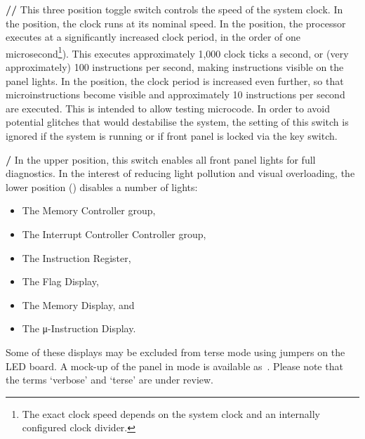 \begin{description}
\item{\bfseries{}//} This three position toggle
  switch controls the speed of the system clock. In the 
  position, the clock runs at its nominal speed. In the 
  position, the processor executes at a significantly increased clock
  period, in the order of one microsecond\footnote{The exact clock
    speed depends on the system clock and an internally configured
    clock divider.}). This executes approximately 1,000 clock ticks a
  second, or (very approximately) 100 instructions per second, making
  instructions visible on the panel lights. In the  position,
  the clock period is increased even further, so that
  microinstructions become visible and approximately 10 instructions
  per second are executed. This is intended to allow testing
  microcode. In order to avoid potential glitches that would
  destabilise the system, the setting of this switch is ignored if the
  system is running or if front panel is locked via the key switch.

\item{\bfseries{}/} In the upper position, this switch
  enables all front panel lights for full diagnostics. In the interest
  of reducing light pollution and visual overloading, the lower
  position () disables a number of lights:
\begin{itemize}
\item The Memory Controller group,
\item The Interrupt Controller Controller group,
\item The Instruction Register,
\item The Flag Display,
\item The Memory Display, and
\item The μ-Instruction Display.
\end{itemize}

Some of these displays may be excluded from terse mode using jumpers
on the LED board. A mock-up of the panel in  mode is
available as~. Please note that the terms
‘verbose’ and ‘terse’ are under review.


\end{description}
